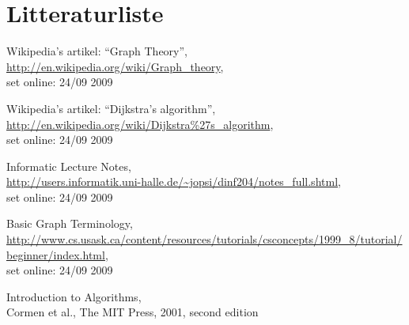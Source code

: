 \documentclass[10pt,a4paper,danish]{article}
\begin{document}
\section{Litteraturliste}
\begin{thebibliography}{9}
  Wikipedia's artikel: "`Graph Theory"',\\
  \url{http://en.wikipedia.org/wiki/Graph\_theory},\\
  set online: 24/09 2009


  Wikipedia's artikel: "`Dijkstra's algorithm"',\\
  \url{http://en.wikipedia.org/wiki/Dijkstra%27s_algorithm},\\
  set online: 24/09 2009


  Informatic Lecture Notes,\\
  \url{http://users.informatik.uni-halle.de/~jopsi/dinf204/notes_full.shtml},\\
  set online: 24/09 2009


  Basic Graph Terminology,\\
  \url{http://www.cs.usask.ca/content/resources/tutorials/csconcepts/1999_8/tutorial/beginner/index.html},\\
  set online: 24/09 2009


  Introduction to Algorithms,\\
  Cormen et al.,
  The MIT Press, 2001, second edition

\end{thebibliography}
\end{document}
